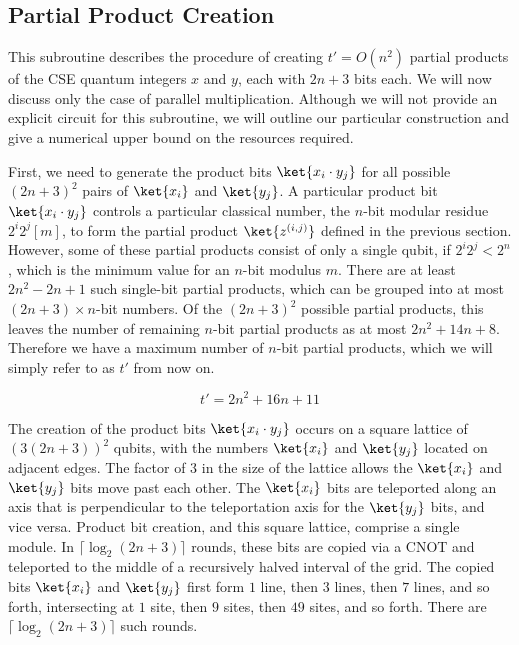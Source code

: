 \subsection{Partial Product Creation}
\label{subsec:ppc}

This subroutine describes the procedure of creating $t'=O(n^2)$ partial products of
the CSE quantum integers $x$ and $y$, each with $2n+3$ bits each. We will now
discuss only the case of parallel multiplication. Although we
will not provide an explicit circuit for this subroutine, we will outline
our particular construction and give a numerical upper bound on the
resources required.

First, we need to generate the product bits
$\ket{x_i\cdot y_j}$ for all possible $(2n+3)^2$ pairs of $\ket{x_i}$ and
$\ket{y_j}$.
A particular product bit $\ket{x_i \cdot y_j}$
controls a particular classical number, the
$n$-bit modular residue $2^i 2^j [m]$, to form the partial product
$\ket{z^{(i,j)}}$ defined
in the previous section. However, some of these partial products
consist of only a single qubit, if $2^i 2^j < 2^n$, which is the minimum
value for an $n$-bit modulus $m$. There are at least $2n^2 - 2n + 1$
such single-bit partial products, which can be grouped into at most
$(2n+3)\times n$-bit numbers. Of the $(2n+3)^2$ possible partial products,
this leaves the number of remaining $n$-bit partial products as at most
$2n^2 + 14n +8$. Therefore we have a maximum number of $n$-bit
partial products, which we will simply refer to as $t'$ from now on.

\begin{equation}
t'=2n^2+16n+11
\label{eqn:tprime}
\end{equation}

The creation of the product bits $\ket{x_i \cdot y_j}$ occurs on a
square lattice of $(3(2n+3))^2$ qubits, with the numbers $\ket{x_i}$ and
$\ket{y_j}$ located on adjacent edges. The factor of $3$ in the size of the lattice
allows the $\ket{x_i}$ and $\ket{y_j}$ bits move past each other.
The $\ket{x_i}$ bits are teleported along an axis that is perpendicular to
the teleportation axis for the $\ket{y_j}$ bits, and vice versa.
Product bit creation, and this square lattice, comprise a single module.
In $\lceil \log_2 (2n+3) \rceil$
rounds, these bits are copied via a CNOT and teleported to the middle of
a recursively halved interval of the grid. The copied bits $\ket{x_i}$ and
$\ket{y_j}$
first form $1$ line, then $3$ lines, then $7$ lines, and so forth,
intersecting at $1$ site, then $9$ sites, then $49$ sites, and so forth.
There are $\lceil \log_2 (2n+3) \rceil$ such rounds.

